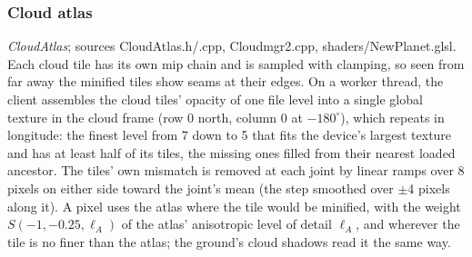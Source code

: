 \documentclass[Orbiter Technical Reference.tex]{subfiles}
\begin{document}
\begin{sloppypar}
\subsubsection{Cloud atlas}
\textit{CloudAtlas}; sources CloudAtlas.h/.cpp, Cloudmgr2.cpp, shaders/NewPlanet.glsl. Each cloud tile has its own mip chain and is sampled with clamping, so seen from far away the minified tiles show seams at their edges. On a worker thread, the client assembles the cloud tiles' opacity of one file level into a single global texture in the cloud frame (row 0 north, column 0 at $-180^{\circ}$), which repeats in longitude: the finest level from 7 down to 5 that fits the device's largest texture and has at least half of its tiles, the missing ones filled from their nearest loaded ancestor. The tiles' own mismatch is removed at each joint by linear ramps over 8 pixels on either side toward the joint's mean (the step smoothed over $\pm$4 pixels along it). A pixel uses the atlas where the tile would be minified, with the weight $S(-1, -0.25, \ell_{A})$ of the atlas' anisotropic level of detail $\ell_{A}$, and wherever the tile is no finer than the atlas; the ground's cloud shadows read it the same way.




\end{sloppypar}
\end{document}

